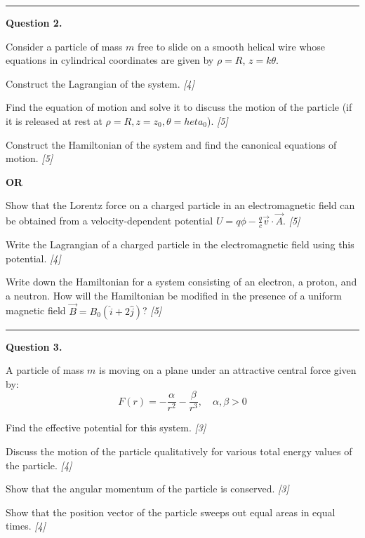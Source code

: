 \documentclass[11pt,a4paper]{article}
\newcommand{\pts}[1]{\hfill   \textit{[#1]}}
\begin{document}
\medskip\rule{\linewidth}{0.2pt}




\noindent   \textbf{Question 2.}

\begin{parts}
  \item Consider a particle of mass $m$ free to slide on a smooth helical wire whose equations in cylindrical coordinates are given by $\rho = R$, $z = k \theta$.
    
\begin{parts}
      \item Construct the Lagrangian of the system. \pts{4}
      \item Find the equation of motion and solve it to discuss the motion of the particle (if it is released at rest at $\rho=R, z=z_0,  \theta= heta_0$). \pts{5}
      \item Construct the Hamiltonian of the system and find the canonical equations of motion. \pts{5}
    \end{parts}
\end{parts}
\hfill   \textbf{OR}

\begin{parts}
  \item Show that the Lorentz force on a charged particle in an electromagnetic field can be obtained from a velocity-dependent potential $U = q\phi - \frac{q}{c}\vec{v}\cdot\vec{A}$. \pts{5}
  \item Write the Lagrangian of a charged particle in the electromagnetic field using this potential. \pts{4}
  \item Write down the Hamiltonian for a system consisting of an electron, a proton, and a neutron. How will the Hamiltonian be modified in the presence of a uniform magnetic field $\vec{B} = B_0 (\hat{i} + 2\hat{j})$? \pts{5}
\end{parts}

\medskip\rule{\linewidth}{0.2pt}




\noindent   \textbf{Question 3.}

\begin{parts}
  \item A particle of mass $m$ is moving on a plane under an attractive central force given by:
    \[ F(r) = -\frac{\alpha}{r^2} - \frac{\beta}{r^3}, \quad \alpha,\beta > 0 \]
    
\begin{parts}
      \item Find the effective potential for this system. \pts{3}
      \item Discuss the motion of the particle qualitatively for various total energy values of the particle. \pts{4}
      \item Show that the angular momentum of the particle is conserved. \pts{3}
      \item Show that the position vector of the particle sweeps out equal areas in equal times. \pts{4}
    \end{parts}
\end{parts}
\end{document}
